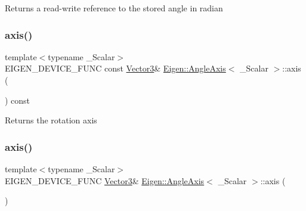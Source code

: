 \begin{DoxyReturn}{Returns}
a read-\/write reference to the stored angle in radian 
\end{DoxyReturn}
\mbox{\label{class_eigen_1_1_angle_axis_ae40cc36c8dcd9977e1540d91a80696bb}} 
\subsubsection{\texorpdfstring{axis()}{axis()}\hspace{0.1cm}{\footnotesize\ttfamily [1/2]}}
{\footnotesize\ttfamily template$<$typename \+\_\+\+Scalar$>$ \\
E\+I\+G\+E\+N\+\_\+\+D\+E\+V\+I\+C\+E\+\_\+\+F\+U\+NC const \mbox{\hyperlink{class_eigen_1_1_matrix}{Vector3}}\& \mbox{\hyperlink{class_eigen_1_1_angle_axis}{Eigen\+::\+Angle\+Axis}}$<$ \+\_\+\+Scalar $>$\+::axis (\begin{DoxyParamCaption}{ }\end{DoxyParamCaption}) const\hspace{0.3cm}{\ttfamily [inline]}}

\begin{DoxyReturn}{Returns}
the rotation axis 
\end{DoxyReturn}
\mbox{\label{class_eigen_1_1_angle_axis_afa1d16eb73d70be903a68955ffb4c324}} 
\subsubsection{\texorpdfstring{axis()}{axis()}\hspace{0.1cm}{\footnotesize\ttfamily [2/2]}}
{\footnotesize\ttfamily template$<$typename \+\_\+\+Scalar$>$ \\
E\+I\+G\+E\+N\+\_\+\+D\+E\+V\+I\+C\+E\+\_\+\+F\+U\+NC \mbox{\hyperlink{class_eigen_1_1_matrix}{Vector3}}\& \mbox{\hyperlink{class_eigen_1_1_angle_axis}{Eigen\+::\+Angle\+Axis}}$<$ \+\_\+\+Scalar $>$\+::axis (\begin{DoxyParamCaption}{ }\end{DoxyParamCaption})\hspace{0.3cm}{\ttfamily [inline]}}

